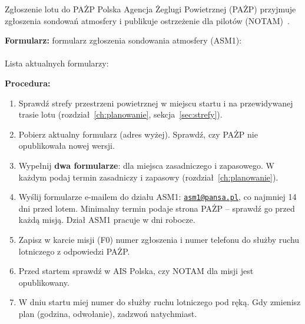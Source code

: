 \begin{sekcja}{Zgłoszenie lotu do PAŻP}
Polska Agencja Żeglugi Powietrznej (PAŻP) przyjmuje zgłoszenia sondowań atmosfery i publikuje ostrzeżenie dla pilotów (NOTAM)~\cite{pazp}.

\textbf{Formularz:} formularz zgłoszenia sondowania atmosfery (ASM1):\\
\\
Lista aktualnych formularzy: 

\textbf{Procedura:}
\begin{enumerate}
  \item Sprawdź strefy przestrzeni powietrznej w miejscu startu i na przewidywanej trasie lotu (rozdział~\ref{ch:planowanie}, sekcja~\ref{sec:strefy}).
  \item Pobierz aktualny formularz (adres wyżej). Sprawdź, czy PAŻP nie opublikowała nowej wersji.
  \item Wypełnij \textbf{dwa formularze}: dla miejsca zasadniczego i zapasowego. W każdym podaj termin zasadniczy i zapasowy (rozdział~\ref{ch:planowanie}).
  \item Wyślij formularze e-mailem do działu ASM1: \href{mailto:asm1@pansa.pl}{\nolinkurl{asm1@pansa.pl}}, co najmniej 14 dni przed lotem. Minimalny termin podaje strona PAŻP -- sprawdź go przed każdą misją. Dział ASM1 pracuje w dni robocze.
  \item Zapisz w karcie misji (F0) numer zgłoszenia i numer telefonu do służby ruchu lotniczego z odpowiedzi PAŻP.
  \item Przed startem sprawdź w AIS Polska, czy NOTAM dla misji jest opublikowany.
  \item W dniu startu miej numer do służby ruchu lotniczego pod ręką. Gdy zmienisz plan (godzina, odwołanie), zadzwoń natychmiast.
\end{enumerate}
\end{sekcja}

